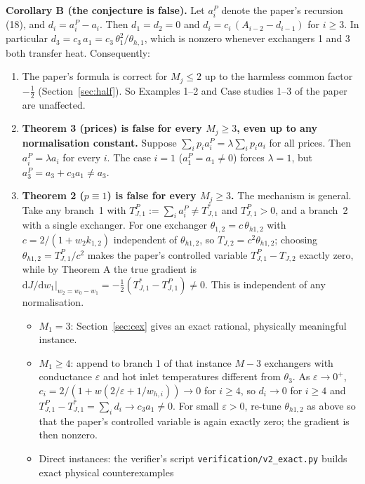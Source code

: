 \documentclass[11pt,a4paper]{report}
\begin{document}
\textbf{Corollary B (the conjecture is false).} Let \(a^P_i\) denote the paper's recursion (18), and
\(d_i = a^P_i - a_i\). Then \(d_1 = d_2 = 0\) and \(d_i = c_i\,(A_{i-2} - d_{i-1})\) for \(i \ge 3\). In particular
\(d_3 = c_3\,a_1 = c_3\,\theta_1^2/\theta_{h,1}\), which is nonzero whenever exchangers 1 and 3 both transfer heat.
Consequently:
\begin{enumerate}
\item The paper's formula is correct for \(M_j \le 2\) up to the harmless common factor \(-\tfrac12\)
(Section~\ref{sec:half}). So Examples 1--2 and Case studies 1--3 of the paper are unaffected.
\item \textbf{Theorem 3 (prices) is false for every \(M_j \ge 3\), even up to any normalisation constant.} Suppose
\(\sum_i p_i a^P_i = \lambda \sum_i p_i a_i\) for all prices. Then \(a^P_i = \lambda a_i\) for every \(i\). The case
\(i = 1\) (\(a^P_1 = a_1 \ne 0\)) forces \(\lambda = 1\), but \(a^P_3 = a_3 + c_3a_1 \ne a_3\).
\item \textbf{Theorem 2 (\(p \equiv 1\)) is false for every \(M_j \ge 3\).} The mechanism is general. Take any branch~1
with \(T^P_{J,1} := \sum_i a^P_i \ne T^*_{J,1}\) and \(T^P_{J,1} > 0\), and a branch~2 with a single exchanger. For one
exchanger \(\theta_{1,2} = c\,\theta_{h1,2}\) with \(c = 2/(1+w_2k_{1,2})\) independent of \(\theta_{h1,2}\), so
\(T_{J,2} = c^2\theta_{h1,2}\); choosing \(\theta_{h1,2} = T^P_{J,1}/c^2\) makes the paper's controlled variable
\(T^P_{J,1} - T_{J,2}\) exactly zero, while by Theorem A the true gradient is
\(\mathrm{d}J/\mathrm{d}w_1|_{w_2=w_0-w_1} = -\tfrac12(T^*_{J,1} - T^P_{J,1}) \ne 0\). This is independent of any
normalisation.
\begin{itemize}
\item \(M_1 = 3\): Section~\ref{sec:cex} gives an exact rational, physically meaningful instance.
\item \(M_1 \ge 4\): append to branch 1 of that instance \(M-3\) exchangers with conductance \(\varepsilon\) and hot
inlet temperatures different from \(\theta_3\). As \(\varepsilon \to 0^+\),
\(c_i = 2/(1 + w(2/\varepsilon + 1/w_{h,i})) \to 0\) for \(i \ge 4\), so \(d_i \to 0\) for \(i \ge 4\) and
\(T^P_{J,1} - T^*_{J,1} = \sum_i d_i \to c_3a_1 \ne 0\). For small \(\varepsilon > 0\), re-tune \(\theta_{h1,2}\) as above
so that the paper's controlled variable is again exactly zero; the gradient is then nonzero.
\item Direct instances: the verifier's script \texttt{verification/v2\_exact.py} builds exact physical counterexamples

\end{itemize}
\end{enumerate}
\end{document}
